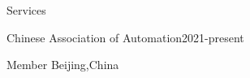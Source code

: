 \begin{rSection}{Services}

\begin{rSubsection}{Chinese Association of Automation}{2021-present}{}{}
  \item {Member} \hfill {Beijing,China}
\end{rSubsection}






\end{rSection}
